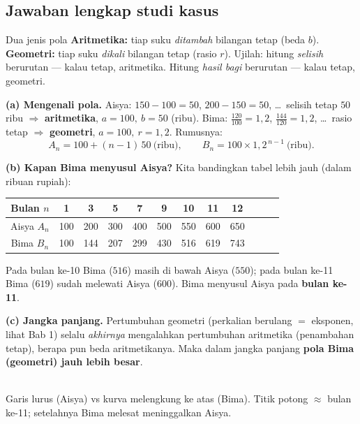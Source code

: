 \subsection*{Jawaban lengkap studi kasus}

\begin{ingat}{Dua jenis pola}
\textbf{Aritmetika:} tiap suku \emph{ditambah} bilangan tetap (beda $b$).
\textbf{Geometri:} tiap suku \emph{dikali} bilangan tetap (rasio $r$).
Ujilah: hitung \emph{selisih} berurutan --- kalau tetap, aritmetika. Hitung
\emph{hasil bagi} berurutan --- kalau tetap, geometri.
\end{ingat}

\textbf{(a) Mengenali pola.}
Aisya: $150{-}100=50$, $200{-}150=50$, \dots\ selisih tetap $50$ ribu
$\Rightarrow$ \textbf{aritmetika}, $a=100,\ b=50$ (ribu).
Bima: $\frac{120}{100}=1{,}2$, $\frac{144}{120}=1{,}2$, \dots\ rasio tetap
$\Rightarrow$ \textbf{geometri}, $a=100,\ r=1{,}2$.
Rumusnya:
\[
A_n = 100 + (n-1)\,50 \ \text{(ribu)}, \qquad B_n = 100\times 1{,}2^{\,n-1}\ \text{(ribu)}.
\]

\textbf{(b) Kapan Bima menyusul Aisya?} Kita bandingkan tabel lebih jauh (dalam
ribuan rupiah):
\begin{center}\small
\begin{tabular}{c|ccccccccccc}
\toprule
Bulan $n$ & 1 & 3 & 5 & 7 & 9 & 10 & 11 & 12 \\
\midrule
Aisya $A_n$ & 100 & 200 & 300 & 400 & 500 & 550 & 600 & 650 \\
Bima $B_n$ & 100 & 144 & 207 & 299 & 430 & 516 & 619 & 743 \\
\bottomrule
\end{tabular}
\end{center}
Pada bulan ke-10 Bima ($516$) masih di bawah Aisya ($550$); pada bulan ke-11
Bima ($619$) sudah melewati Aisya ($600$).
\jadi Bima menyusul Aisya pada \textbf{bulan ke-11}.

\textbf{(c) Jangka panjang.} Pertumbuhan geometri (perkalian berulang $=$
eksponen, lihat Bab 1) selalu \emph{akhirnya} mengalahkan pertumbuhan aritmetika
(penambahan tetap), berapa pun beda aritmetikanya. Maka dalam jangka panjang
\textbf{pola Bima (geometri) jauh lebih besar}.

\begin{center}
\\
{\small Garis lurus (Aisya) vs kurva melengkung ke atas (Bima). Titik potong
$\approx$ bulan ke-11; setelahnya Bima melesat meninggalkan Aisya.}
\end{center}

